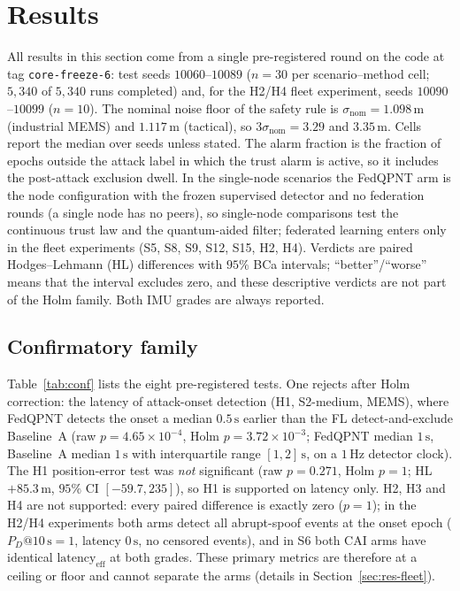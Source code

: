 \documentclass[journal]{IEEEtran}
\begin{document}
\section{Results}
\label{sec:results}
All results in this section come from a single pre-registered round on the code at tag \texttt{core-freeze-6}: test seeds $10060$--$10089$ ($n=30$ per scenario--method cell; $5{,}340$ of $5{,}340$ runs completed) and, for the H2/H4 fleet experiment, seeds $10090$--$10099$ ($n=10$). The nominal noise floor of the safety rule is $\sigma_{\mathrm{nom}} = 1.098\,\mathrm{m}$ (industrial MEMS) and $1.117\,\mathrm{m}$ (tactical), so $3\sigma_{\mathrm{nom}} = 3.29$ and $3.35\,\mathrm{m}$. Cells report the median over seeds unless stated. The alarm fraction is the fraction of epochs outside the attack label in which the trust alarm is active, so it includes the post-attack exclusion dwell. In the single-node scenarios the FedQPNT arm is the node configuration with the frozen supervised detector and no federation rounds (a single node has no peers), so single-node comparisons test the continuous trust law and the quantum-aided filter; federated learning enters only in the fleet experiments (S5, S8, S9, S12, S15, H2, H4). Verdicts are paired Hodges--Lehmann (HL) differences with $95\%$ BCa intervals; ``better''/``worse'' means that the interval excludes zero, and these descriptive verdicts are not part of the Holm family. Both IMU grades are always reported.

\subsection{Confirmatory family}
Table~\ref{tab:conf} lists the eight pre-registered tests. One rejects after Holm correction: the latency of attack-onset detection (H1, S2-medium, MEMS), where FedQPNT detects the onset a median $0.5\,\mathrm{s}$ earlier than the FL detect-and-exclude Baseline~A (raw $p = 4.65\times10^{-4}$, Holm $p = 3.72\times10^{-3}$; FedQPNT median $1\,\mathrm{s}$, Baseline~A median $1\,\mathrm{s}$ with interquartile range $[1,2]\,\mathrm{s}$, on a $1\,\mathrm{Hz}$ detector clock). The H1 position-error test was \emph{not} significant (raw $p=0.271$, Holm $p=1$; HL $+85.3\,\mathrm{m}$, $95\%$ CI $[-59.7, 235]$), so H1 is supported on latency only. H2, H3 and H4 are not supported: every paired difference is exactly zero ($p=1$); in the H2/H4 experiments both arms detect all abrupt-spoof events at the onset epoch ($P_D@10\,\mathrm{s} = 1$, latency $0\,\mathrm{s}$, no censored events), and in S6 both CAI arms have identical $\mathrm{latency}_{\mathrm{eff}}$ at both grades. These primary metrics are therefore at a ceiling or floor and cannot separate the arms (details in Section~\ref{sec:res-fleet}).
\end{document}
